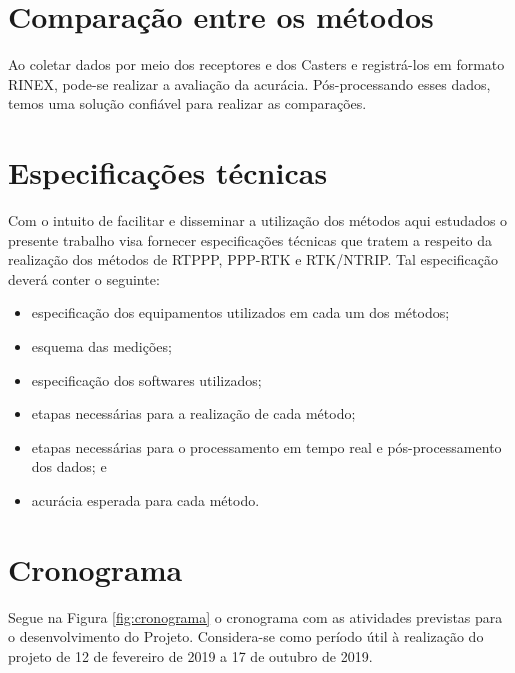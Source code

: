 \section{Comparação entre os métodos}


Ao coletar dados por meio dos receptores e dos Casters e registrá-los em formato RINEX, pode-se realizar a avaliação da acurácia. Pós-processando esses dados, temos uma solução confiável para realizar as comparações. 


\section{Especificações técnicas}

Com o intuito de facilitar e disseminar a utilização dos métodos aqui estudados o presente trabalho visa fornecer especificações técnicas que tratem a respeito da realização dos métodos de RTPPP, PPP-RTK e RTK/NTRIP. Tal especificação deverá conter o seguinte:
\begin{itemize}
    \item especificação dos equipamentos utilizados em cada um dos métodos;
    \item esquema das medições;
    \item especificação dos softwares utilizados;
    \item etapas necessárias para a realização de cada método;
    \item etapas necessárias para o processamento em tempo real e pós-processamento dos dados; e
    \item acurácia esperada para cada método.
\end{itemize}

\section{Cronograma}
\noindent

Segue na Figura \ref{fig:cronograma} o cronograma com as atividades previstas para o desenvolvimento do Projeto. Considera-se como período útil à realização do projeto de 12 de fevereiro de 2019 a 17 de outubro de 2019.

